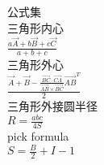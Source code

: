 	公式集\\
	三角形内心\\ $\frac{a\vec {A} + b\vec{B} + c\vec{C}}{a + b + c}$ \\
	三角形外心\\ $\frac{\vec{A} + \vec{B} - \frac{\overrightarrow {BC} \cdot \overrightarrow{CA}}{\overrightarrow {AB} \times \overrightarrow{BC}}\overrightarrow {AB}^T}{2}$ \\
	三角形外接圆半径\\
	$R = \frac{abc}{4S}$\\
	pick formula\\
	$S = \frac{B}{2} + I - 1$
	
